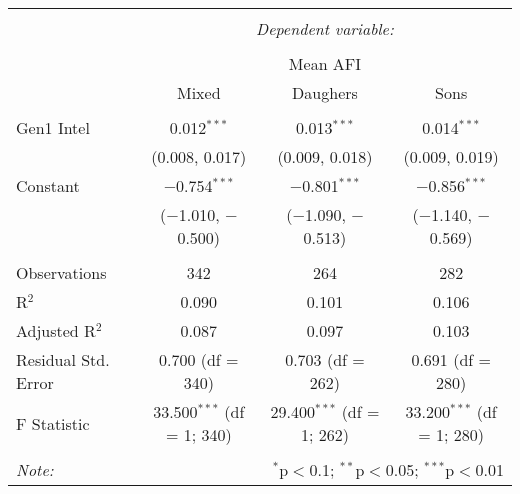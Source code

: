 
\begingroup 
\small 
\begin{tabular}{@{\extracolsep{1pt}}lccc} 
\\[-1.8ex]\hline 
\hline \\[-1.8ex] 
 & \multicolumn{3}{c}{\textit{Dependent variable:}} \\ 
\cline{2-4} 
\\[-1.8ex] & \multicolumn{3}{c}{Mean AFI} \\ 
 & Mixed & Daughers & Sons \\ 
\hline \\[-1.8ex] 
 Gen1 Intel & 0.012$^{***}$ & 0.013$^{***}$ & 0.014$^{***}$ \\ 
  & (0.008, 0.017) & (0.009, 0.018) & (0.009, 0.019) \\ 
  Constant & $-$0.754$^{***}$ & $-$0.801$^{***}$ & $-$0.856$^{***}$ \\ 
  & ($-$1.010, $-$0.500) & ($-$1.090, $-$0.513) & ($-$1.140, $-$0.569) \\ 
 \hline \\[-1.8ex] 
Observations & 342 & 264 & 282 \\ 
R$^{2}$ & 0.090 & 0.101 & 0.106 \\ 
Adjusted R$^{2}$ & 0.087 & 0.097 & 0.103 \\ 
Residual Std. Error & 0.700 (df = 340) & 0.703 (df = 262) & 0.691 (df = 280) \\ 
F Statistic & 33.500$^{***}$ (df = 1; 340) & 29.400$^{***}$ (df = 1; 262) & 33.200$^{***}$ (df = 1; 280) \\ 
\hline 
\hline \\[-1.8ex] 
\textit{Note:}  & \multicolumn{3}{r}{$^{*}$p$<$0.1; $^{**}$p$<$0.05; $^{***}$p$<$0.01} \\ 
\end{tabular} 
\endgroup 
